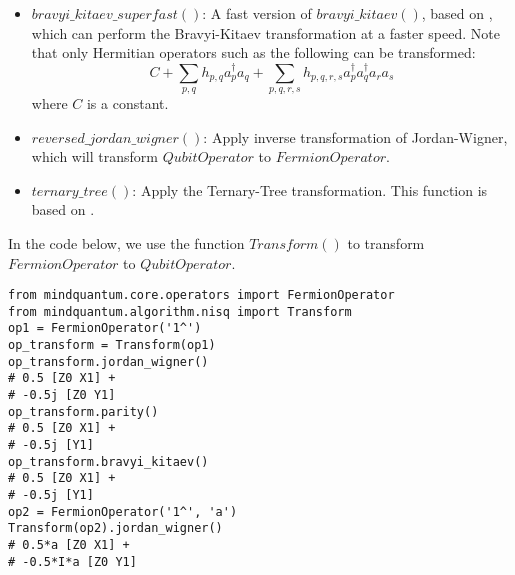 \begin{itemize}
    \item $bravyi\_kitaev\_superfast()$: A fast version of $bravyi\_kitaev()$, based on \cite{setia2018bravyi}, which can perform the Bravyi-Kitaev transformation at a faster speed. Note that only Hermitian operators such as the following can be transformed:
    \begin{equation}
        C + \sum_{p,q} h_{p,q} a_p^{\dagger} a_q + \sum_{p,q,r,s} h_{p,q,r,s} a_p^{\dagger} a_q^{\dagger} a_r a_s
    \end{equation}
     where $C$ is a constant. 
     \item $reversed\_jordan\_wigner()$: Apply inverse transformation of Jordan-Wigner, which will transform $QubitOperator$ to $FermionOperator$. 
     \item $ternary\_tree()$: Apply the Ternary-Tree transformation. This function is based on \cite{jiang2020optimal}. 
\end{itemize}
In the code below, we use the function $Transform()$ to transform $FermionOperator$ to $QubitOperator$. 
\begin{lstlisting}
from mindquantum.core.operators import FermionOperator
from mindquantum.algorithm.nisq import Transform
op1 = FermionOperator('1^')
op_transform = Transform(op1)
op_transform.jordan_wigner()
# 0.5 [Z0 X1] +
# -0.5j [Z0 Y1]
op_transform.parity()
# 0.5 [Z0 X1] +
# -0.5j [Y1]
op_transform.bravyi_kitaev()
# 0.5 [Z0 X1] +
# -0.5j [Y1]
op2 = FermionOperator('1^', 'a')
Transform(op2).jordan_wigner()
# 0.5*a [Z0 X1] +
# -0.5*I*a [Z0 Y1]
\end{lstlisting}